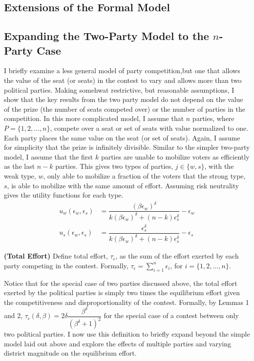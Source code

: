 \documentclass[12pt]{article}
\newenvironment{definition}[1][Definition]{\begin{trivlist}
\item[\hskip \labelsep {\bfseries #1}]}{\end{trivlist}}
\begin{document}
\begin{appendix}
\section{Extensions of the Formal Model}

\subsection{Expanding the Two-Party Model to the $n$-Party Case}

I briefly examine a less general model of party competition,but one that allows the value of the seat (or seats) in the contest to vary and allows more than two political parties. Making somehwat restrictive, but reasonable assumptions, I show that the key results from the two party model do not depend on the value of the prize (the number of seats competed over) or the number of parties in the competition. In this more complicated model, I assume that $n$ parties, where $P = \{1, 2,..., n\}$, compete over a seat or set of seats with value normalized to one. Each party places the same value on the seat (or set of seats). Again, I assume for simplicity that the prize is infinitely divisible. Similar to the simpler two-party model, I assume that the first $k$ parties are unable to mobilize voters as efficiently as the last $n - k$ parties. This gives two types of parties, $j \in \{w, s\}$, with the weak type, $w$, only able to mobilize a fraction of the voters that the strong type, $s$, is able to mobilize with the same amount of effort. Assuming risk neutrality gives the utility functions for each type.
\begin{align}
u_w(\epsilon_w, \epsilon_s) &= \dfrac{(\beta \epsilon_w)^\delta}{k(\beta \epsilon_w)^\delta + (n-k)\epsilon_s^\delta} - \epsilon_w \\
u_s(\epsilon_w, \epsilon_s) &= \dfrac{\epsilon_s^\delta}{k(\beta \epsilon_w)^\delta + (n-k)\epsilon_s^\delta} - \epsilon_s
\end{align}
\begin{definition}
\textbf{(Total Effort)} Define total effort, $\tau_\epsilon$, as the sum of the effort exerted by each party competing in the contest. Formally, $\tau_\epsilon = \sum_{i = 1}^n \epsilon_i$, for $i = \{1, 2,..., n\}$. 
\end{definition}
Notice that for the special case of two parties discussed above, the total effort exerted by the political parties is simply two times the equilibrium effort given the competitiveness and disproportionality of the contest. Formally, by Lemmas 1 and 2, $\tau_\epsilon(\delta, \beta) = 2\delta\dfrac{\beta^\delta}{(\beta^\delta + 1)^2}$ for the special case of a contest between only two political parties. I now use this definition to briefly expand beyond the simple model laid out above and explore the effects of multiple parties and varying district magnitude on the equilibrium effort.

\end{appendix}
\end{document}
